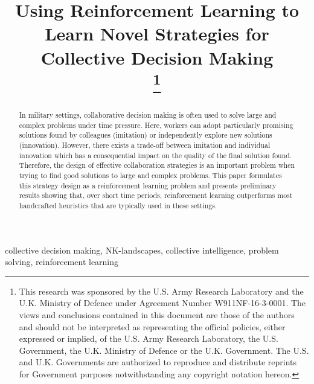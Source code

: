 \documentclass[conference]{IEEEtran}
\begin{document}
\title{
Using Reinforcement Learning to Learn Novel Strategies
for Collective Decision Making \\
\thanks{
This research was sponsored by the U.S. Army Research Laboratory
and the U.K. Ministry of Defence
under Agreement Number W911NF-16-3-0001.
The views and conclusions contained in this document are those of the authors
and should not be interpreted as representing the official policies,
either expressed or implied, of the U.S. Army Research Laboratory,
the U.S. Government, the U.K.  Ministry of Defence or the U.K. Government.
The U.S. and U.K. Governments are authorized to reproduce and distribute
reprints for Government purposes notwithstanding any copyright notation hereon.
}
}

\author{
\and
{}
\and
{}
}

\maketitle

\begin{abstract}
In military settings, collaborative decision making
is often used to solve large and complex problems under time pressure.
Here, workers can adopt
particularly promising solutions found by colleagues (imitation)
or independently explore new solutions (innovation).
However, there exists a trade-off between imitation and individual innovation
which has a consequential impact on the quality of the final solution found.
Therefore, the design of effective collaboration strategies
is an important problem when trying to find good solutions
to large and complex problems.
This paper formulates this strategy design as a reinforcement learning problem
and presents preliminary results
showing that, over short time periods, reinforcement learning outperforms
most handcrafted heuristics that are typically used in these settings.
\end{abstract}
\begin{IEEEkeywords}
collective decision making, NK-landscapes, collective intelligence,
problem solving, reinforcement learning
\end{IEEEkeywords}
\end{document}
